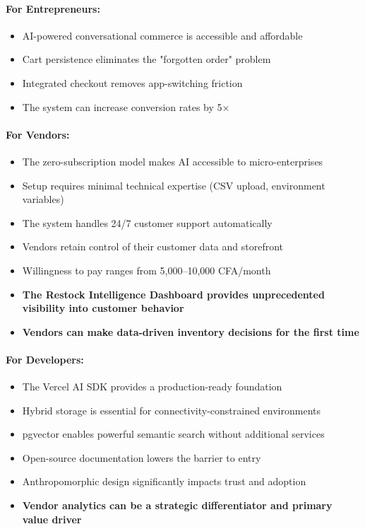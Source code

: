 \documentclass[12pt,a4paper]{article}
\begin{document}
\paragraph{For Entrepreneurs:}

\begin{itemize}
    \item AI-powered conversational commerce is accessible and affordable
    \item Cart persistence eliminates the "forgotten order" problem
    \item Integrated checkout removes app-switching friction
    \item The system can increase conversion rates by 5×
\end{itemize}

\paragraph{For Vendors:}

\begin{itemize}
    \item The zero-subscription model makes AI accessible to micro-enterprises
    \item Setup requires minimal technical expertise (CSV upload, environment variables)
    \item The system handles 24/7 customer support automatically
    \item Vendors retain control of their customer data and storefront
    \item Willingness to pay ranges from 5,000--10,000 CFA/month
    \item \textbf{The Restock Intelligence Dashboard provides unprecedented visibility into customer behavior}
    \item \textbf{Vendors can make data-driven inventory decisions for the first time}
\end{itemize}

\paragraph{For Developers:}

\begin{itemize}
    \item The Vercel AI SDK provides a production-ready foundation
    \item Hybrid storage is essential for connectivity-constrained environments
    \item pgvector enables powerful semantic search without additional services
    \item Open-source documentation lowers the barrier to entry
    \item Anthropomorphic design significantly impacts trust and adoption
    \item \textbf{Vendor analytics can be a strategic differentiator and primary value driver}
\end{itemize}
\end{document}
